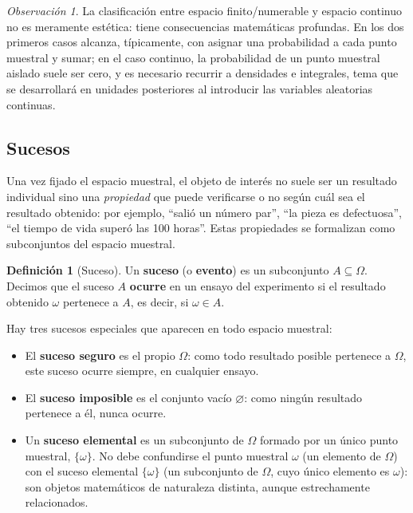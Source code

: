 \documentclass[11pt,a4paper]{article}
\theoremstyle{plain}
\theoremstyle{definition}
\newtheorem{definicion}[teorema]{Definición}
\theoremstyle{remark}
\newtheorem{observacion}[teorema]{Observación}
\begin{document}
\begin{observacion}
La clasificación entre espacio finito/numerable y espacio continuo no es meramente estética: tiene consecuencias matemáticas profundas. En los dos primeros casos alcanza, típicamente, con asignar una probabilidad a cada punto muestral y sumar; en el caso continuo, la probabilidad de un punto muestral aislado suele ser cero, y es necesario recurrir a densidades e integrales, tema que se desarrollará en unidades posteriores al introducir las variables aleatorias continuas.
\end{observacion}

\subsection{Sucesos}

Una vez fijado el espacio muestral, el objeto de interés no suele ser un resultado individual sino una \emph{propiedad} que puede verificarse o no según cuál sea el resultado obtenido: por ejemplo, ``salió un número par'', ``la pieza es defectuosa'', ``el tiempo de vida superó las 100 horas''. Estas propiedades se formalizan como subconjuntos del espacio muestral.

\begin{definicion}[Suceso]
Un \textbf{suceso} (o \textbf{evento}) es un subconjunto $A \subseteq \Omega$. Decimos que el suceso $A$ \textbf{ocurre} en un ensayo del experimento si el resultado obtenido $\omega$ pertenece a $A$, es decir, si $\omega \in A$.
\end{definicion}

Hay tres sucesos especiales que aparecen en todo espacio muestral:

\begin{itemize}[leftmargin=2em]
\item El \textbf{suceso seguro} es el propio $\Omega$: como todo resultado posible pertenece a $\Omega$, este suceso ocurre siempre, en cualquier ensayo.
\item El \textbf{suceso imposible} es el conjunto vacío $\varnothing$: como ningún resultado pertenece a él, nunca ocurre.
\item Un \textbf{suceso elemental} es un subconjunto de $\Omega$ formado por un único punto muestral, $\{\omega\}$. No debe confundirse el punto muestral $\omega$ (un elemento de $\Omega$) con el suceso elemental $\{\omega\}$ (un subconjunto de $\Omega$, cuyo único elemento es $\omega$): son objetos matemáticos de naturaleza distinta, aunque estrechamente relacionados.
\end{itemize}
\end{document}
